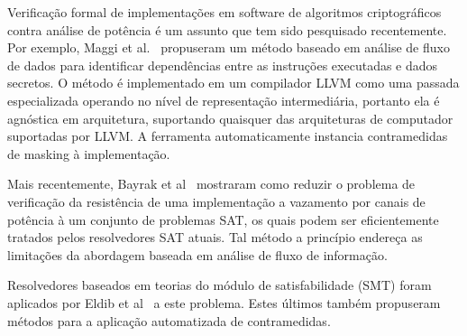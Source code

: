 Verificação formal de implementações em software de algoritmos criptográficos contra análise de potência é um assunto que tem sido pesquisado recentemente.
%
%
Por exemplo, Maggi et al.~\cite{maggi2013automated, Agosta2013} propuseram um método baseado em análise de fluxo de dados para identificar dependências entre as instruções executadas e dados secretos.
%
%
O método é implementado em um compilador LLVM como uma passada especializada operando no nível de representação intermediária, portanto ela é agnóstica em arquitetura, suportando quaisquer das arquiteturas de computador suportadas por LLVM. A ferramenta automaticamente instancia contramedidas de masking à implementação.
%


Mais recentemente, Bayrak et al~\cite{BayrakRegazzoniNovo2013, Bayrak2014} mostraram como reduzir o problema de verificação da resistência de uma implementação a vazamento por canais de potência à um conjunto de problemas SAT, os quais podem ser eficientemente tratados pelos resolvedores SAT atuais. Tal método a princípio endereça as limitações da abordagem baseada em análise de fluxo de informação.

%
Resolvedores baseados em teorias do módulo de satisfabilidade (SMT) foram aplicados por Eldib et al~\cite{EldibWang2014, EldibWang2014_QMS, EldibWang2014_SMT, EldibWang2014_sc_sniffer} a este problema. Estes últimos também propuseram métodos para a aplicação automatizada de contramedidas.
